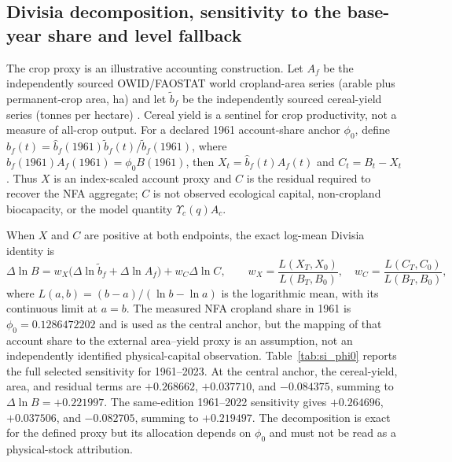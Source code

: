 \documentclass[11pt,a4paper]{article}
\newcommand{\Ups}{\Upsilon_c}
\begin{document}
\newpage
\subsection{Divisia decomposition, sensitivity to the base-year share and level fallback}\label{si:divisia}

The crop proxy is an illustrative accounting construction. Let $A_f$ be the independently sourced OWID/FAOSTAT world cropland-area series (arable plus permanent-crop area, ha) and let $\tilde b_f$ be the independently sourced cereal-yield series (tonnes per hectare) \citep{OWIDCropland2026,OWIDCereal2026}. Cereal yield is a sentinel for crop productivity, not a measure of all-crop output. For a declared 1961 account-share anchor $\phi_0$, define $\hat b_f(t)=\hat b_f(1961)\tilde b_f(t)/\tilde b_f(1961)$, where $\hat b_f(1961)A_f(1961)=\phi_0B(1961)$, then $X_t=\hat b_f(t)A_f(t)$ and $C_t=B_t-X_t$. Thus $X$ is an index-scaled account proxy and $C$ is the residual required to recover the NFA aggregate; $C$ is not observed ecological capital, non-cropland biocapacity, or the model quantity $\Ups(q)A_c$.

When $X$ and $C$ are positive at both endpoints, the exact log-mean Divisia identity is
\begin{equation}
\Delta\ln B=w_X\bigl(\Delta\ln\tilde b_f+\Delta\ln A_f\bigr)+w_C\Delta\ln C,
\qquad w_X=\frac{L(X_T,X_0)}{L(B_T,B_0)},\quad w_C=\frac{L(C_T,C_0)}{L(B_T,B_0)},
\end{equation}
where $L(a,b)=(b-a)/(\ln b-\ln a)$ is the logarithmic mean, with its continuous limit at $a=b$. The measured NFA cropland share in 1961 is $\phi_0=0.1286472202$ and is used as the central anchor, but the mapping of that account share to the external area--yield proxy is an assumption, not an independently identified physical-capital observation. Table~\ref{tab:si_phi0} reports the full selected sensitivity for 1961--2023. At the central anchor, the cereal-yield, area, and residual terms are $+0.268662$, $+0.037710$, and $-0.084375$, summing to $\Delta\ln B=+0.221997$. The same-edition 1961--2022 sensitivity gives $+0.264696$, $+0.037506$, and $-0.082705$, summing to $+0.219497$. The decomposition is exact for the defined proxy but its allocation depends on $\phi_0$ and must not be read as a physical-stock attribution.
\end{document}
